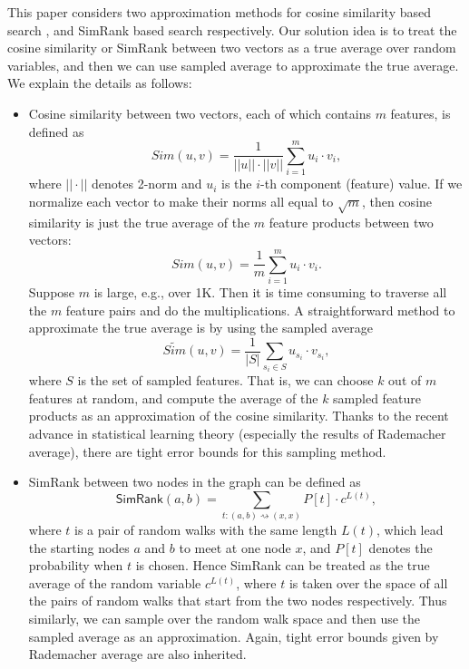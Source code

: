 \documentclass{article}
\begin{document}
This paper considers two approximation methods for cosine similarity based search \cite{SGM00,Xia16,ATY13,TAJY14}, and SimRank based search \cite{JW02,LH10,FNS13,KMK14} respectively. Our solution idea is to treat the cosine similarity or SimRank between two vectors as a true average over random variables, and then we can use sampled average to approximate the true average. We explain the details as follows:
\begin{itemize}
\item Cosine similarity between two vectors, each of which contains $m$ features, is defined as
$$Sim(u,v) = \frac{1}{||u||\cdot||v||} \sum_{i=1}^m u_i\cdot v_i,$$
where $||\cdot||$ denotes 2-norm and $u_i$ is the $i$-th component (feature) value. If we normalize each vector to make their norms all equal to $\sqrt{m}$, then cosine similarity is just the true average of the $m$ feature products between two vectors:
$$Sim(u,v) = \frac{1}{m} \sum_{i=1}^m u_i\cdot v_i.$$
Suppose $m$ is large, e.g., over 1K. Then it is time consuming to traverse all the $m$ feature pairs and do the multiplications. A straightforward method to approximate the true average is by using the sampled average
$$\widetilde{Sim}(u,v) = \frac{1}{|S|} \sum_{s_i\in S} u_{s_i}\cdot v_{s_i},$$
where $S$ is the set of sampled features. 
That is, we can choose $k$ out of $m$ features at random, and compute the average of the $k$ sampled feature products as an approximation of the cosine similarity.
Thanks to the recent advance in statistical learning theory (especially the results of Rademacher average), there are tight error bounds for this sampling method.
\item SimRank between two nodes in the graph can be defined as
$$\textsf{SimRank}(a,b) = \sum_{t: (a,b) \rightsquigarrow (x,x)} P[t]\cdot c^{L(t)},$$
where $t$ is a pair of random walks with the same length $L(t)$, which lead the starting nodes $a$ and $b$ to meet at one node $x$, and $P[t]$ denotes the probability when $t$ is chosen. Hence SimRank can be treated as the true average of the random variable $c^{L(t)}$, where $t$ is taken over the space of all the pairs of random walks that start from the two nodes respectively. Thus similarly, we can sample over the random walk space and then use the sampled average as an approximation. Again, tight error bounds given by Rademacher average are also inherited.
\end{itemize}
\end{document}
